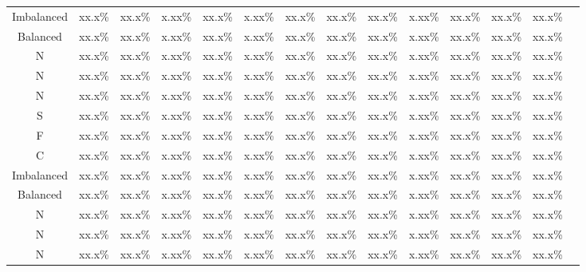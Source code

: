 \documentclass[journal]{IEEEtran}
\begin{document}
\begin{table}[!htbp]
\begin{center}
\begin{threeparttable}
\begin{tabular}{cccccccccccccc}
 Imbalanced & xx.x\% &  xx.x\%  &  x.xx\%   & xx.x\%    &  x.xx\%  & xx.x\%& xx.x\% &xx.x\%&  x.xx\%& xx.x\%&xx.x\%&xx.x\% \\
  Balanced & xx.x\% &  xx.x\%  &  x.xx\%   & xx.x\%    &  x.xx\%  & xx.x\%& xx.x\% &xx.x\%&  x.xx\%& xx.x\%&xx.x\%&xx.x\% \\
        N & xx.x\% &  xx.x\%  &  x.xx\%   & xx.x\%    &  x.xx\%  & xx.x\%& xx.x\% &xx.x\%&  x.xx\%& xx.x\%&xx.x\%&xx.x\% \\
         N & xx.x\% &  xx.x\%  &  x.xx\%   & xx.x\%    &  x.xx\%  & xx.x\%& xx.x\% &xx.x\%&  x.xx\%& xx.x\%&xx.x\%&xx.x\% \\
          N & xx.x\% &  xx.x\%  &  x.xx\%   & xx.x\%    &  x.xx\%  & xx.x\%& xx.x\% &xx.x\%&  x.xx\%& xx.x\%&xx.x\%&xx.x\% \\
          S & xx.x\% &  xx.x\%  &  x.xx\%   & xx.x\%    &  x.xx\%  & xx.x\%& xx.x\% &xx.x\%&  x.xx\%& xx.x\%&xx.x\%&xx.x\% \\
 F & xx.x\% &  xx.x\%  &  x.xx\%   & xx.x\%    &  x.xx\%  & xx.x\%& xx.x\% &xx.x\%&  x.xx\%& xx.x\%&xx.x\%&xx.x\% \\
 C & xx.x\% &  xx.x\%  &  x.xx\%   & xx.x\%    &  x.xx\%  & xx.x\%& xx.x\% &xx.x\%&  x.xx\%& xx.x\%&xx.x\%&xx.x\% \\
 Imbalanced & xx.x\% &  xx.x\%  &  x.xx\%   & xx.x\%    &  x.xx\%  & xx.x\%& xx.x\% &xx.x\%&  x.xx\%& xx.x\%&xx.x\%&xx.x\% \\
  Balanced & xx.x\% &  xx.x\%  &  x.xx\%   & xx.x\%    &  x.xx\%  & xx.x\%& xx.x\% &xx.x\%&  x.xx\%& xx.x\%&xx.x\%&xx.x\% \\
        N & xx.x\% &  xx.x\%  &  x.xx\%   & xx.x\%    &  x.xx\%  & xx.x\%& xx.x\% &xx.x\%&  x.xx\%& xx.x\%&xx.x\%&xx.x\% \\
         N & xx.x\% &  xx.x\%  &  x.xx\%   & xx.x\%    &  x.xx\%  & xx.x\%& xx.x\% &xx.x\%&  x.xx\%& xx.x\%&xx.x\%&xx.x\% \\
          N & xx.x\% &  xx.x\%  &  x.xx\%   & xx.x\%    &  x.xx\%  & xx.x\%& xx.x\% &xx.x\%&  x.xx\%& xx.x\%&xx.x\%&xx.x\% \\
          \hline
\end{tabular}
\end{threeparttable}
\end{center}
\end{table}
\end{document}
